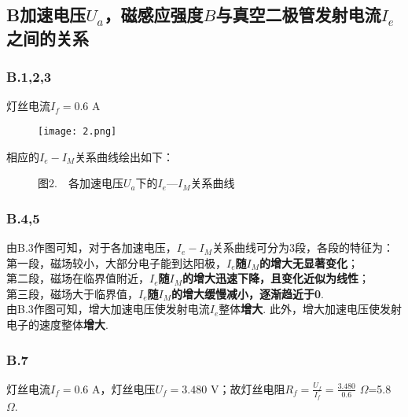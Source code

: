 \documentclass{ctexart}
\begin{document}
\subsection*{B\quad 加速电压$U_a$，磁感应强度$B$与真空二极管发射电流$I_e$之间的关系}
\subsubsection*{B.1,2,3}
\noindent 灯丝电流$I_f=0.6$  $\mathrm{A}$\\
\begin{figure}[H]
    \centering
    \texttt{[image: 2.png]}
  \end{figure}
相应的$I_e-I_M$关系曲线绘出如下：
\clearpage
\begin{figure}[htbp]
 \centering
  \quad
  \quad
  \quad
  \caption*{图$2.\quad$各加速电压$U_a$下的$I_e—I_M$关系曲线}
 \end{figure}
\subsubsection*{B.4,5}
\noindent 由B.3作图可知，对于各加速电压，$I_e-I_M$关系曲线可分为3段，各段的特征为：\\
\noindent 第一段，磁场较小，大部分电子能到达阳极，\textbf{$I_e$随$I_M$的增大无显著变化}；\\
\noindent 第二段，磁场在临界值附近，\textbf{$I_e$随$I_M$的增大迅速下降，且变化近似为线性}；\\
\noindent 第三段，磁场大于临界值，\textbf{$I_e$随$I_M$的增大缓慢减小，逐渐趋近于0}.\\

\noindent 由B.3作图可知，增大加速电压使发射电流$I_e$整体\textbf{增大}. 此外，增大加速电压使发射电子的速度整体\textbf{增大}.\\

\subsubsection*{B.7}
\noindent 灯丝电流$I_f=0.6$  $\mathrm{A}$，灯丝电压$U_f=3.480$  $\mathrm{V}$；故灯丝电阻$R_f=\displaystyle\frac{U_f}{I_f}=\frac{3.480}{0.6}$  $\Omega$=5.8  $\Omega$.\\
\end{document}
